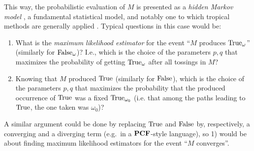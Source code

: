 
This way, the probabilistic evaluation of $M$ is presented as a \emph{hidden Markov model} \cite{Baum1966}, a fundamental statistical model, and notably one to which tropical methods are generally applied \cite{Pachter2004}.
Typical questions in this case would be:
%
\begin{enumerate}
 \item What is the \emph{maximum likelihood estimator} for the event ``$M$ produces $\mathrm{True}_\omega$'' (similarly for $\mathrm{False}_\omega$)?
 I.e., which is the choice of the parameters $p,q$ that maximizes the probability of getting $\mathrm{True}_\omega$ after all tossings in $M$?
 \item Knowing that $M$ produced $\mathrm{True}$ (similarly for $\mathrm{False}$), which is the choice of the parameters $p,q$ that maximizes the probability that the produced occurrence of $\mathrm{True}$ was a fixed $\mathrm{True}_{\omega_0}$ (i.e. that among the paths leading to $\mathrm{True}$, the one taken was $\omega_0$)?
\end{enumerate}
A similar argument could be done by replacing $\mathrm{True}$ and $\mathrm{False}$ by, respectively, a converging and a diverging term (e.g.~in a $\mathbf{PCF}$-style language), so 1) would be about finding maximum likelihood estimators for the event ``$M$ converges''.

